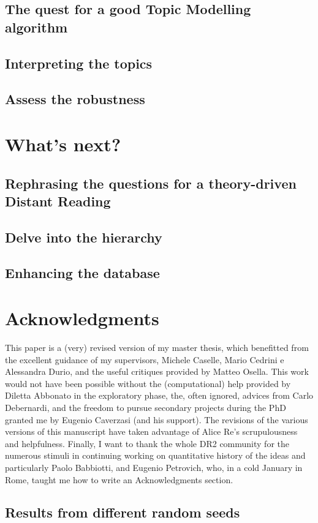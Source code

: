 \documentclass[a4paper, 11pt, headings=standardclasses, tablecaptionsbelow]{scrartcl}
\begin{document}
\subsection{The quest for a good Topic Modelling algorithm}

\subsection{Interpreting the topics}

\subsection{Assess the robustness}

\section{What's next?}
\subsection{Rephrasing the questions for a theory-driven Distant Reading}

\subsection{Delve into the hierarchy}

\subsection{Enhancing the database}

\section*{Acknowledgments}
This paper is a (very) revised version of my master thesis, which benefitted from the excellent guidance of my supervisors, Michele Caselle, Mario Cedrini e Alessandra Durio, and the useful critiques provided by Matteo Osella.
This work would not have been possible without the (computational) help provided by Diletta Abbonato in the exploratory phase, the, often ignored, advices from Carlo Debernardi, and the freedom to pursue secondary projects during the PhD granted me by Eugenio Caverzasi (and his support).
The revisions of the various versions of this manuscript have taken advantage of Alice Re's scrupulousness and helpfulness.
Finally, I want to thank the whole DR2 community for the numerous stimuli in continuing working on quantitative history of the ideas and particularly Paolo Babbiotti, and Eugenio Petrovich, who, in a cold January in Rome, taught me how to write an Acknowledgments section.

\clearpage
\begin{refcontext}[sorting=nyt]
  \printbibliography
\end{refcontext}
\clearpage

\begin{appendices}
  \section{Results from different random seeds}

\end{appendices}
\end{document}
